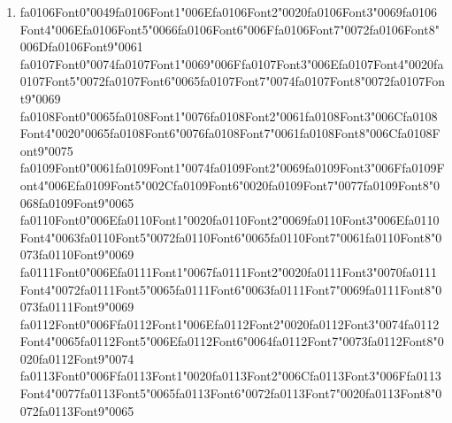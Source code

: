 \documentclass[12pt]{article}
\begin{document}
\begin{enumerate}[label=Q\arabic*.]
\item {\csname fa0106Font0\endcsname\char"0049}{\csname fa0106Font1\endcsname\char"006E}{\csname fa0106Font2\endcsname\char"0020}{\csname fa0106Font3\endcsname\char"0069}{\csname fa0106Font4\endcsname\char"006E}{\csname fa0106Font5\endcsname\char"0066}{\csname fa0106Font6\endcsname\char"006F}{\csname fa0106Font7\endcsname\char"0072}{\csname fa0106Font8\endcsname\char"006D}{\csname fa0106Font9\endcsname\char"0061} {\csname fa0107Font0\endcsname\char"0074}{\csname fa0107Font1\endcsname\char"0069}{\char"006F}{\csname fa0107Font3\endcsname\char"006E}{\csname fa0107Font4\endcsname\char"0020}{\csname fa0107Font5\endcsname\char"0072}{\csname fa0107Font6\endcsname\char"0065}{\csname fa0107Font7\endcsname\char"0074}{\csname fa0107Font8\endcsname\char"0072}{\csname fa0107Font9\endcsname\char"0069} {\csname fa0108Font0\endcsname\char"0065}{\csname fa0108Font1\endcsname\char"0076}{\csname fa0108Font2\endcsname\char"0061}{\csname fa0108Font3\endcsname\char"006C}{\csname fa0108Font4\endcsname\char"0020}{\char"0065}{\csname fa0108Font6\endcsname\char"0076}{\csname fa0108Font7\endcsname\char"0061}{\csname fa0108Font8\endcsname\char"006C}{\csname fa0108Font9\endcsname\char"0075} {\csname fa0109Font0\endcsname\char"0061}{\csname fa0109Font1\endcsname\char"0074}{\csname fa0109Font2\endcsname\char"0069}{\csname fa0109Font3\endcsname\char"006F}{\csname fa0109Font4\endcsname\char"006E}{\csname fa0109Font5\endcsname\char"002C}{\csname fa0109Font6\endcsname\char"0020}{\csname fa0109Font7\endcsname\char"0077}{\csname fa0109Font8\endcsname\char"0068}{\csname fa0109Font9\endcsname\char"0065} {\csname fa0110Font0\endcsname\char"006E}{\csname fa0110Font1\endcsname\char"0020}{\csname fa0110Font2\endcsname\char"0069}{\csname fa0110Font3\endcsname\char"006E}{\csname fa0110Font4\endcsname\char"0063}{\csname fa0110Font5\endcsname\char"0072}{\csname fa0110Font6\endcsname\char"0065}{\csname fa0110Font7\endcsname\char"0061}{\csname fa0110Font8\endcsname\char"0073}{\csname fa0110Font9\endcsname\char"0069} {\csname fa0111Font0\endcsname\char"006E}{\csname fa0111Font1\endcsname\char"0067}{\csname fa0111Font2\endcsname\char"0020}{\csname fa0111Font3\endcsname\char"0070}{\csname fa0111Font4\endcsname\char"0072}{\csname fa0111Font5\endcsname\char"0065}{\csname fa0111Font6\endcsname\char"0063}{\csname fa0111Font7\endcsname\char"0069}{\csname fa0111Font8\endcsname\char"0073}{\csname fa0111Font9\endcsname\char"0069} {\csname fa0112Font0\endcsname\char"006F}{\csname fa0112Font1\endcsname\char"006E}{\csname fa0112Font2\endcsname\char"0020}{\csname fa0112Font3\endcsname\char"0074}{\csname fa0112Font4\endcsname\char"0065}{\csname fa0112Font5\endcsname\char"006E}{\csname fa0112Font6\endcsname\char"0064}{\csname fa0112Font7\endcsname\char"0073}{\csname fa0112Font8\endcsname\char"0020}{\csname fa0112Font9\endcsname\char"0074} {\csname fa0113Font0\endcsname\char"006F}{\csname fa0113Font1\endcsname\char"0020}{\csname fa0113Font2\endcsname\char"006C}{\csname fa0113Font3\endcsname\char"006F}{\csname fa0113Font4\endcsname\char"0077}{\csname fa0113Font5\endcsname\char"0065}{\csname fa0113Font6\endcsname\char"0072}{\csname fa0113Font7\endcsname\char"0020}{\csname fa0113Font8\endcsname\char"0072}{\csname fa0113Font9\endcsname\char"0065} 
\end{enumerate}
\end{document}
